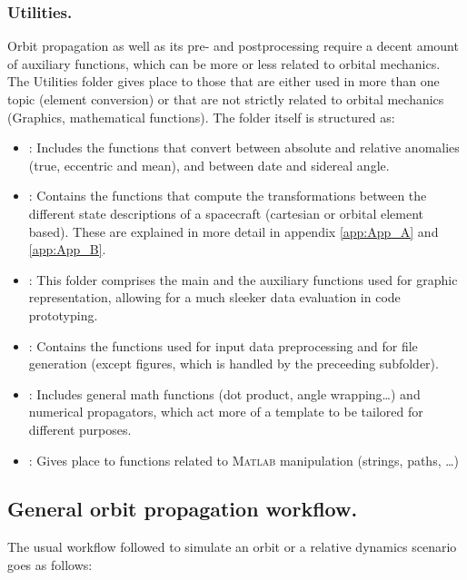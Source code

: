 		\subsubsection{Utilities.}
		\indent Orbit propagation as well as its pre- and postprocessing require a decent amount of auxiliary functions, which can be more or less related to orbital mechanics. The Utilities folder gives place to those that are either used in more than one topic (\eg element conversion) or that are not strictly related to orbital mechanics (\eg Graphics, mathematical functions). The folder itself is structured as:
		\begin{itemize}
		\item[\GMVred{I.}] : Includes the functions that convert between absolute and relative anomalies (true, eccentric and mean), and between date and sidereal angle. 
		\item[\GMVred{II.}] : Contains the functions that compute the transformations between the different state descriptions of a spacecraft (cartesian or orbital element based). These are explained in more detail in appendix \ref{app:App_A} and \ref{app:App_B}.
		\item[\GMVred{III.}] : This folder comprises the main and the auxiliary functions used for graphic representation, allowing for a much sleeker data evaluation in code prototyping.
		\item[\GMVred{IV.}] : Contains the functions used for input data preprocessing and for file generation (except figures, which is handled by the preceeding subfolder).
		\item[\GMVred{V.}] : Includes general math functions (dot product, angle wrapping\ldots) and numerical propagators, which act more of a template to be tailored for different purposes.
		\item[\GMVred{VI.}] : Gives place to functions related to \textsc{Matlab} manipulation (strings, paths, \ldots)
		\end{itemize}
	\subsection{General orbit propagation workflow.}
	\indent The usual workflow followed to simulate an orbit or a relative dynamics scenario goes as follows:
